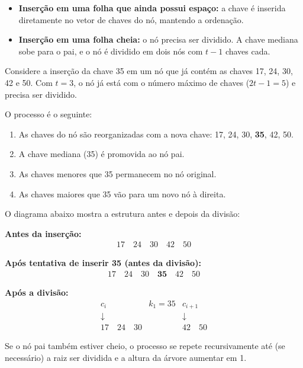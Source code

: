 \begin{itemize}
  \item \textbf{Inserção em uma folha que ainda possui espaço:} a chave é inserida diretamente no vetor de chaves do nó, mantendo a ordenação.
  \item \textbf{Inserção em uma folha cheia:} o nó precisa ser dividido. A chave mediana sobe para o pai, e o nó é dividido em dois nós com \( t - 1 \) chaves cada.
\end{itemize}

Considere a inserção da chave 35 em um nó que já contém as chaves 17, 24, 30, 42 e 50. 
Com \( t = 3 \), o nó já está com o número máximo de chaves (\( 2t - 1 = 5 \)) e precisa ser dividido.

O processo é o seguinte:

\begin{enumerate}
  \item As chaves do nó são reorganizadas com a nova chave: 17, 24, 30, \textbf{35}, 42, 50.
  \item A chave mediana (35) é promovida ao nó pai.
  \item As chaves menores que 35 permanecem no nó original.
  \item As chaves maiores que 35 vão para um novo nó à direita.
\end{enumerate}

O diagrama abaixo mostra a estrutura antes e depois da divisão:

\vspace{1em}
\textbf{Antes da inserção:}
\[
\begin{array}{c}
\boxed{17 \quad 24 \quad 30 \quad 42 \quad 50}
\end{array}
\]

\textbf{Após tentativa de inserir 35 (antes da divisão):}
\[
\begin{array}{c}
\boxed{17 \quad 24 \quad 30 \quad \textbf{35} \quad 42 \quad 50}
\end{array}
\]

\textbf{Após a divisão:}
\[
\begin{array}{ccccccc}
  \boxed{c_i}                  &  k_1 = 35 & \boxed{c_{i+1}} \\
  \downarrow                   &           & \downarrow  \\
  \boxed{17 \quad 24 \quad 30} &           & \boxed{42 \quad 50}
\end{array}
\]

Se o nó pai também estiver cheio, o processo se repete recursivamente até (se necessário) a raiz ser dividida e a altura da árvore aumentar em 1.

